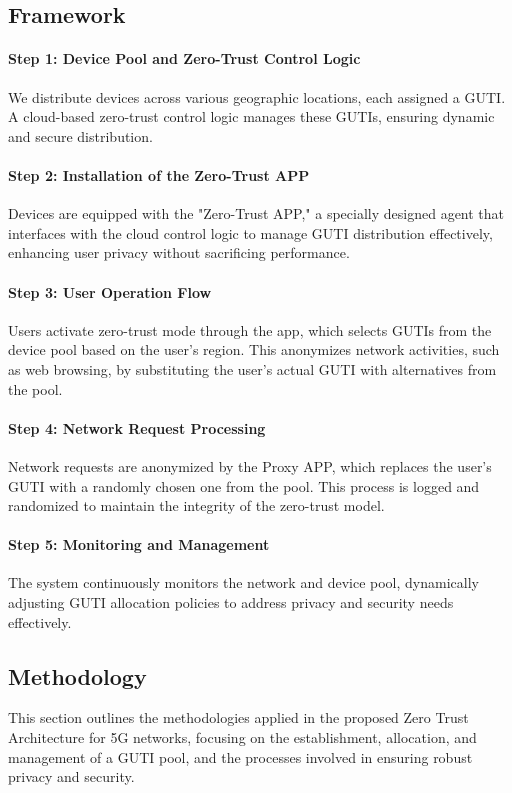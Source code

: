 \documentclass[sigplan,screen]{acmart}
\begin{document}
\subsection{Framework}
\paragraph{Step 1: Device Pool and Zero-Trust Control Logic}
We distribute devices across various geographic locations, each assigned a GUTI. A cloud-based zero-trust control logic manages these GUTIs, ensuring dynamic and secure distribution.
\paragraph{Step 2: Installation of the Zero-Trust APP}
Devices are equipped with the "Zero-Trust APP," a specially designed agent that interfaces with the cloud control logic to manage GUTI distribution effectively, enhancing user privacy without sacrificing performance.
\paragraph{Step 3: User Operation Flow}
Users activate zero-trust mode through the app, which selects GUTIs from the device pool based on the user’s region. This anonymizes network activities, such as web browsing, by substituting the user's actual GUTI with alternatives from the pool.
\paragraph{Step 4: Network Request Processing}
Network requests are anonymized by the Proxy APP, which replaces the user's GUTI with a randomly chosen one from the pool. This process is logged and randomized to maintain the integrity of the zero-trust model.
\paragraph{Step 5: Monitoring and Management}
The system continuously monitors the network and device pool, dynamically adjusting GUTI allocation policies to address privacy and security needs effectively.


\subsection{Methodology}
This section outlines the methodologies applied in the proposed Zero Trust Architecture for 5G networks, focusing on the establishment, allocation, and management of a GUTI pool, and the processes involved in ensuring robust privacy and security.
\end{document}
